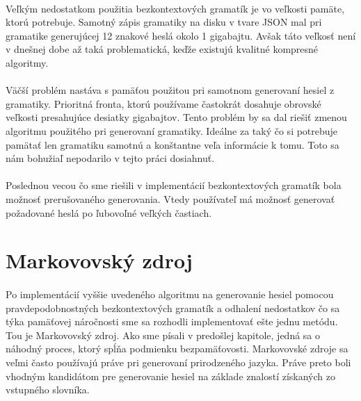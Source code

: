 \paragraph{}
Veľkým nedostatkom použitia bezkontextových gramatík je vo veľkosti pamäte, ktorú potrebuje. Samotný zápis gramatiky na disku v tvare JSON mal pri gramatike generujúcej 12 znakové heslá okolo 1 gigabajtu. Avšak táto veľkosť není v dnešnej dobe až taká problematická, keďže existujú kvalitné kompresné algoritmy.

\paragraph{}
Väčší problém nastáva s pamäťou použitou pri samotnom generovaní hesiel z gramatiky. Prioritná fronta, ktorú používame častokrát dosahuje obrovské veľkosti presahujúce desiatky gigabajtov. Tento problém by sa dal riešiť zmenou algoritmu použitého pri generovaní gramatiky. Ideálne za taký čo si potrebuje pamätať len gramatiku samotnú a konštantne veľa informácie k tomu. Toto sa nám bohužiaľ nepodarilo v tejto práci dosiahnuť.

\paragraph{}
Poslednou vecou čo sme riešili v implementácií bezkontextových gramatík bola možnosť prerušovaného generovania. Vtedy používateľ má možnosť generovať požadované heslá po ľubovoľné veľkých častiach.

\section{Markovovský zdroj}
\paragraph{}
Po implementácií vyššie uvedeného algoritmu na generovanie hesiel pomocou pravdepodobnostných bezkontextových gramatík a odhalení nedostatkov čo sa týka pamäťovej náročnosti sme sa rozhodli implementovať ešte jednu metódu. Tou je Markovovský zdroj. Ako sme písali v predošlej kapitole, jedná sa o náhodný proces, ktorý spĺňa podmienku bezpamäťovosti. Markovovské zdroje sa veľmi často používajú práve pri generovaní prirodzeného jazyka. Práve preto boli vhodným kandidátom pre generovanie hesiel na základe znalostí získaných zo vstupného slovníka. 

